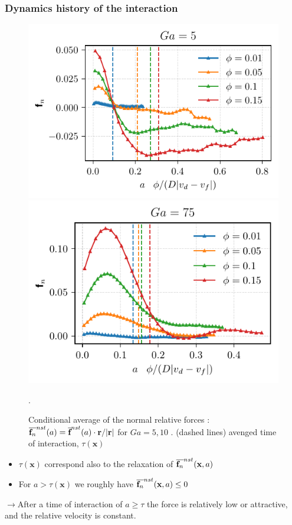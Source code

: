 \documentclass{sintefbeamer}
\begin{document}
\begin{frame}
  \frametitle{Dynamics history of the interaction}
    \begin{figure}
      \includegraphics[height=0.24\textwidth]{image/HOMOGENEOUS/fDrop/f_a_Ga_5.pdf}
      \includegraphics[height=0.24\textwidth]{image/HOMOGENEOUS/fDrop/f_a_Ga_75.pdf}
        \caption{Conditional average of the normal relative forces : $\overline{\textbf{f}_n}^{nst}(a) = \overline{\textbf{f}}^{nst}(a)\cdot \textbf{r}/|\textbf{r}|$ for $Ga = 5,10$ . 
        (dashed lines) avenged time of interaction, $\tau(\textbf{x})$}. 
    \end{figure}

\begin{itemize}
  \item $\tau(\textbf{x})$ correspond also to the relaxation of $\overline{\textbf{f}_n}^{nst}(\textbf{x},a)$
  \item For $a > \tau(\textbf{x})$ we roughly have $\overline{\textbf{f}_n}^{nst}(\textbf{x},a) \leq 0 $
\end{itemize}
$\rightarrow$After a time of interaction of $a \geq \tau$ the force is relatively low or attractive,  and the relative velocity is constant. 
\end{frame}
\end{document}
